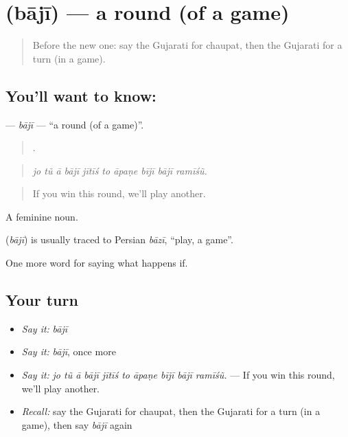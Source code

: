 \section[\texorpdfstring{\gu{બાજી} (bājī)}{બાજી (bājī)}]{ (bājī) — a round (of a game)}

\label{lesson:GU-C533-baji}



\begin{quote}
Before the new one: say the Gujarati for chaupat, then the Gujarati for a turn (in a game).
\end{quote}

\subsection*{You'll want to know: }
\textbf{} — \emph{bājī} — \textquotedblleft{}a round (of a game)\textquotedblright{}.

\begin{quote}
         .
\end{quote}

\begin{quote}
\emph{jo tũ ā bājī jītīś to āpaṇe bījī bājī ramīśũ.}
\end{quote}

\begin{quote}
If you win this round, we'll play another.
\end{quote}

A feminine noun.

\begin{cousinweb}
\textbf{} (\emph{bājī}) is usually traced to Persian \emph{bāzī}, \textquotedblleft{}play, a game\textquotedblright{}.
\end{cousinweb}

\begin{grammarlens}[title={What you've built}]
One more word for saying what happens if.
\end{grammarlens}

\subsection*{Your turn}
\begin{itemize}
\raggedright
  \item \emph{Say it:} \emph{bājī}
  \item \emph{Say it:} \emph{bājī}, once more
  \item \emph{Say it:} \emph{jo tũ ā bājī jītīś to āpaṇe bījī bājī ramīśũ.} — If you win this round, we'll play another.
  \item \emph{Recall:} say the Gujarati for chaupat, then the Gujarati for a turn (in a game), then say \emph{bājī} again
\end{itemize}

